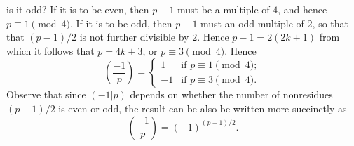 \documentclass[a4paper]{article}
\newcommand{\leg}[2]{\left(\frac{#1}{#2}\right)}
\newcommand{\ileg}[2]{(#1|#2)}
\begin{document}
\begin{enumerate}
is it odd? If it is to be even, then \(p-1\) must be a multiple of \(4\), and hence
\(p\equiv1\pmod{4}\). If it is to be odd, then \(p-1\) must an odd multiple of \(2\),
so that that \((p-1)/2\) is not further divisible by \(2\). Hence \(p-1=2(2k+1)\)
from which it follows that \(p=4k+3\), or \(p\equiv3\pmod{4}\). Hence
\[
\leg{-1}{p}=\begin{cases}
 1&\text{if }p\equiv1\pmod{4};\\
 -1&\text{if }p\equiv3\pmod{4}.
\end{cases}
\]
Observe that since \(\ileg{-1}{p}\) depends on whether the number of nonresidues \((p-1)/2\)
is even or odd, the result can be also be written more succinctly as 
\[
\leg{-1}{p}=(-1)^{(p-1)/2}.
\]
\end{enumerate}
\end{document}
